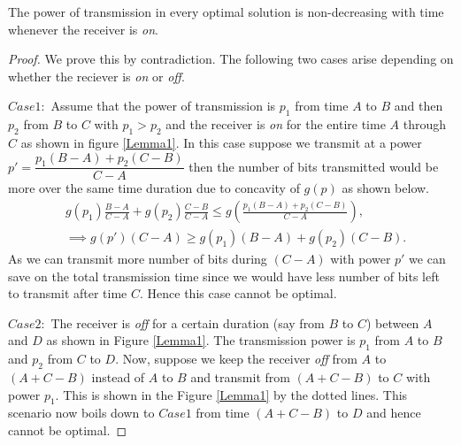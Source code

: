 \begin{lemma}
The power of transmission in every optimal solution is non-decreasing with time whenever the receiver is \textit{on}.
\label{lemma_increasing_power}
\end{lemma}
\begin{proof}
We prove this by contradiction. The following two cases arise depending on whether the reciever is \textit{on} or \textit{off}.

$Case 1:$ Assume that the power of transmission is $p_1$ from time $A$ to $B$ and then $p_2$ from $B$ to $C$ with $p_1>p_2$ and the receiver is \textit{on} for the entire time $A$ through $C$ as shown in figure \ref{Lemma1}. In this case suppose we transmit at a power $p'=\dfrac{p_1(B-A)+p_2(C-B)}{C-A}$ then the number of bits transmitted would be more over the same time duration due to concavity of $g(p)$ as shown below.
\begin{align}
&g(p_1)\frac{B-A}{C-A}+g(p_2)\frac{C-B}{C-A} \le g\left(\frac{p_1(B-A)+p_2(C-B)}{C-A}\right),
\\
&\implies g(p')(C-A)\ge g(p_1)(B-A)+g(p_2)(C-B).  
\end{align}
As we can transmit more number of bits during $(C-A)$ with power $p'$ we can save on the total transmission time since we would have less number of bits left to transmit after time $C$. Hence this case cannot be optimal.

$Case 2:$ The receiver is \textit{off} for a certain duration (say from $B$ to $C$) between $A$ and $D$ as shown in Figure \ref{Lemma1}. The transmission power is $p_1$ from $A$ to $B$ and $p_2$ from $C$ to $D$. Now, suppose we keep the receiver \textit{off} from $A$ to $(A+C-B)$ instead of $A$ to $B$ and transmit from $(A+C-B)$ to $C$ with power $p_1$.  This is shown in the Figure \ref{Lemma1} by the dotted lines. This scenario now boils down to $Case 1$ from time $(A+C-B)$ to $D$ and hence cannot be optimal.
\end{proof}

